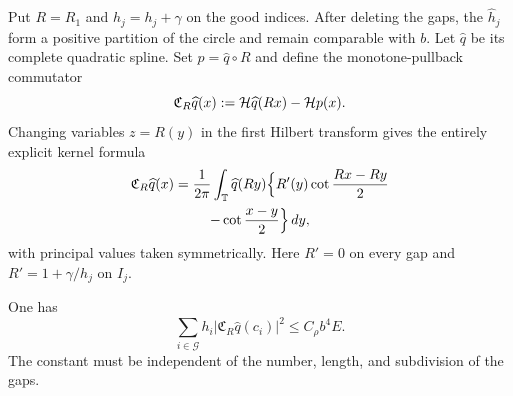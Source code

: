 Put $R=R_1$ and $\widehat h_j=h_j+\gamma$ on the good indices.  After
deleting the gaps, the $\widehat h_j$ form a positive partition of the
circle and remain comparable with $b$.  Let $\widehat q$ be its complete
quadratic spline.  Set $p=\widehat q\circ R$ and define the monotone-pullback
commutator
\begin{equation}\label{ZG:eq:collapse-commutator}
 \mathfrak C_R\widehat q(x)
 :=\mathcal H\widehat q(Rx)-\mathcal H p(x).
\end{equation}
Changing variables $z=R(y)$ in the first Hilbert transform gives the
entirely explicit kernel formula
\begin{multline}\label{ZG:eq:collapse-commutator-kernel}
 \mathfrak C_R\widehat q(x)=\frac1{2\pi}\int_\mathbb T
 \widehat q(Ry)\Big\{R'(y)
 \cot\frac{Rx-Ry}{2}\\
 -\cot\frac{x-y}{2}\Big\}\,dy ,
\end{multline}
with principal values taken symmetrically.  Here $R'=0$ on every gap and
$R'=1+\gamma/h_j$ on $I_j$.

\begin{theorem}
\label{ZG:thm:collapse-commutator}
One has
\begin{equation}\label{ZG:eq:collapse-commutator-square}
 \boxed{
 \sum_{i\in\mathcal G}h_i
 |\mathfrak C_R\widehat q(c_i)|^2
 \le C_\rho b^4E.}
\end{equation}
The constant must be independent of the number, length, and subdivision
of the gaps.
\end{theorem}

